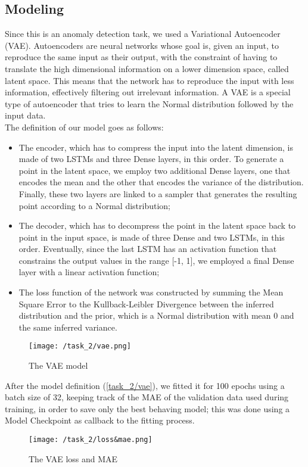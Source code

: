 \documentclass[12pt,a4paper,leqno]{article}
\begin{document}
	\subsection{Modeling}
	Since this is an anomaly detection task, we used a Variational Autoencoder (VAE). Autoencoders are neural networks whose goal is, given an input, to reproduce the same input as their output, with the constraint of having to translate the high dimensional information on a lower dimension space, called latent space. This means that the network has to reproduce the input with less information, effectively filtering out irrelevant information. A VAE is a special type of autoencoder that tries to learn the Normal distribution followed by the input data.\\
	The definition of our model goes as follows:
	\begin{itemize}
		\item The encoder, which has to compress the input into the latent dimension, is made of two LSTMs and three Dense layers, in this order. To generate a point in the latent space, we employ two additional Dense layers, one that encodes the mean and the other that encodes the variance of the distribution. Finally, these two layers are linked to a sampler that generates the resulting point according to a Normal distribution;
		\item The decoder, which has to decompress the point in the latent space back to point in the input space, is made of three Dense and two LSTMs, in this order. Eventually, since the last LSTM has an activation function that constrains the output values in the range [-1, 1], we employed a final Dense layer with a linear activation function;
		\item The loss function of the network was constructed by summing the Mean Square Error to the Kullback-Leibler Divergence between the inferred distribution and the prior, which is a Normal distribution with mean 0 and the same inferred variance.
	\end{itemize}
	\begin{figure}
		\centering
		\texttt{[image: /task\_2/vae.png]}
		\caption{The VAE model}
		\label{task_2/vae}
	\end{figure}
	After the model definition (\autoref{task_2/vae}), we fitted it for 100 epochs using a batch size of 32, keeping track of the MAE of the validation data used during training, in order to save only the best behaving model; this was done using a Model Checkpoint as callback to the fitting process.
	\begin{figure}
		\centering
		\texttt{[image: /task\_2/loss\&mae.png]}
		\caption{The VAE loss and MAE}
		\label{task_2/loss&mae}
	\end{figure}
	
\end{document}
